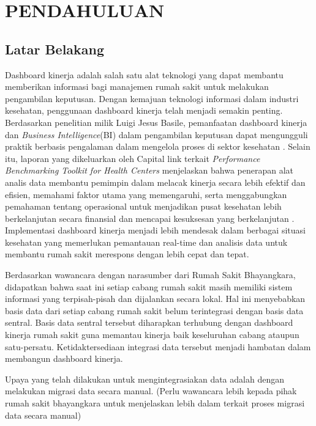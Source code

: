 \chapter{PENDAHULUAN}

\section{Latar Belakang}

Dashboard kinerja adalah salah satu alat teknologi yang dapat membantu memberikan informasi bagi manajemen rumah sakit untuk
melakukan pengambilan keputusan. Dengan kemajuan teknologi informasi dalam industri kesehatan, penggunaan dashboard kinerja telah menjadi semakin penting.
Berdasarkan penelitian milik Luigi Jesus Basile, pemanfaatan dashboard kinerja dan \emph{Business Intelligence}(BI) dalam pengambilan keputusan dapat mengungguli praktik berbasis pengalaman 
dalam mengelola proses di sektor kesehatan \parencite{Basile2023}. Selain itu, laporan yang dikeluarkan oleh Capital link terkait \emph{Performance Benchmarking Toolkit for Health Centers} 
menjelaskan bahwa penerapan alat analis data membantu pemimpin dalam melacak kinerja secara lebih efektif dan efisien, 
memahami faktor utama yang memengaruhi, serta menggabungkan pemahaman tentang operasional untuk menjadikan 
pusat kesehatan lebih berkelanjutan secara finansial dan mencapai kesuksesan yang berkelanjutan \parencite{CapitalLink2017}. 
Implementasi dashboard kinerja menjadi lebih mendesak dalam berbagai situasi kesehatan yang memerlukan pemantauan 
real-time dan analisis data untuk membantu rumah sakit merespons dengan lebih cepat dan tepat.

Berdasarkan wawancara dengan narasumber dari Rumah Sakit Bhayangkara, didapatkan bahwa saat ini setiap cabang rumah sakit masih memiliki 
sistem informasi yang terpisah-pisah dan dijalankan secara lokal. Hal ini menyebabkan basis data dari setiap cabang rumah sakit belum terintegrasi dengan basis data sentral. 
Basis data sentral tersebut diharapkan terhubung dengan dashboard kinerja rumah sakit guna memantau kinerja baik keseluruhan cabang ataupun satu-persatu.
Ketidaktersediaan integrasi data tersebut menjadi hambatan dalam membangun dashboard kinerja.

Upaya yang telah dilakukan untuk mengintegrasiakan data adalah dengan melakukan migrasi data secara manual. 
(Perlu wawancara lebih kepada pihak rumah sakit bhayangkara untuk menjelaskan lebih dalam terkait proses 
migrasi data secara manual)

